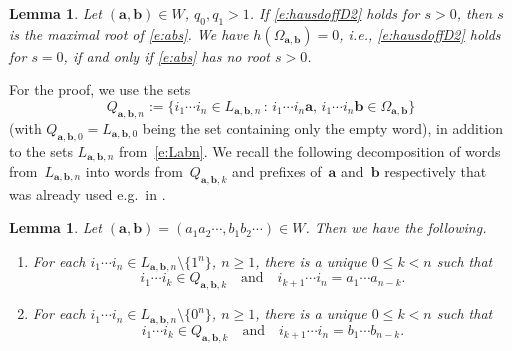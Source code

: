 \documentclass{amsart}
\newtheorem{lemma}[theorem]{Lemma}
\theoremstyle{definition}
\numberwithin{equation}{section}
\newcommand{\ba}{\mathbf{a}}
\newcommand{\bb}{\mathbf{b}}
\begin{document}
\begin{lemma} \label{l:K}
Let $(\ba,\bb) \in W$, $q_0,q_1>1$.
If \eqref{e:hausdoffD2} holds for $s > 0$, then $s$ is the maximal root of \eqref{e:abs}.
We have $h(\Omega_{\ba,\bb}) = 0$, i.e., \eqref{e:hausdoffD2} holds for $s = 0$, if and only if \eqref{e:abs} has no root $s > 0$.
\end{lemma}

For the proof, we use the sets
\[
Q_{\ba,\bb,n} := \big\{i_1\cdots i_n \in L_{\ba,\bb,n} \,:\, i_1\cdots i_n\mathbf{a},\, i_1\cdots i_n\mathbf{b} \in \Omega_{\ba, \bb}\big\}
\]
(with $Q_{\ba,\bb,0} = L_{\ba,\bb,0}$ being the set containing only the empty word), in addition to the sets $L_{\ba,\bb,n}$ from~\eqref{e:Labn}.
We recall the following decomposition of words from~$L_{\ba,\bb,n}$ into words from~$Q_{\ba,\bb,k}$ and prefixes of~$\ba$ and~$\bb$ respectively that was already used e.g.\ in \cite[Proof of Lemma~3]{BarSteVin2014}.

\begin{lemma} \label{l:decomposition}
Let $(\ba,\bb) = (a_1a_2\cdots, b_1b_2\cdots) \in W$.
Then we have the following.
\begin{enumerate}[\upshape (i)]
\item \label{i:Qa}
For each $i_1 \cdots i_n \in L_{\ba,\bb,n} \setminus \{1^n\} $, $n \ge 1$, there is a unique $0 \le k < n$ such that
\begin{equation}
\label{e:decomposition1}
i_1 \cdots i_k \in Q_{\ba,\bb,k} \quad \mbox{and} \quad  i_{k+1} \cdots i_n = a_1 \cdots a_{n-k}.
\end{equation}
\item \label{i:Qb}
For each $i_1 \cdots i_n \in L_{\ba,\bb,n} \setminus \{0^n\} $, $n \ge 1$, there is a unique $0 \le k < n$ such that
\[
i_1 \cdots i_k \in Q_{\ba,\bb,k} \quad \mbox{and} \quad  i_{k+1} \cdots i_n = b_1 \cdots b_{n-k}.
\]
\end{enumerate}
\end{lemma}
\end{document}
